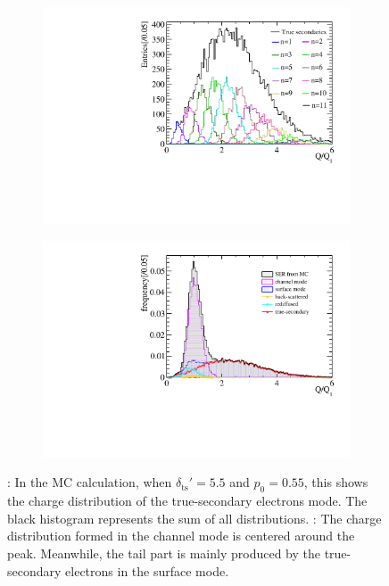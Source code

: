 \begin{figure}[!htbp]
	\begin{subfigure}{0.47\linewidth}
		\includegraphics[width=\textwidth]{PMTRelated/GTmodel/true_all.pdf}
		\caption{}
		\label{fig:true_n}
	\end{subfigure}
	\hfill
	\begin{subfigure}{0.47\linewidth}
		\includegraphics[width=\textwidth]{PMTRelated/GTmodel/allmode.pdf}
		\caption{}
		\label{fig:allmode}
	\end{subfigure}
	\caption{: In the MC calculation, when $\delta_{\mathrm{ts}}' = 5.5$ and $p_0 = 0.55$, this shows the charge distribution of the true-secondary electrons mode. The black histogram represents the sum of all distributions. : The charge distribution formed in the channel mode is centered around the peak. Meanwhile, the tail part is mainly produced by the true-secondary electrons in the surface mode. }
\end{figure}

